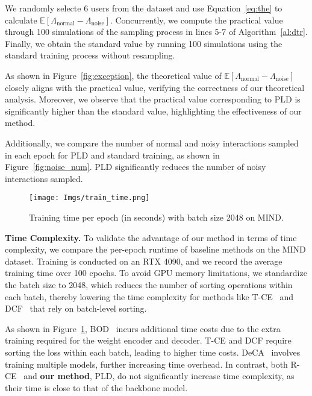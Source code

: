 We randomly selecte 6 users from the dataset and use Equation~\ref{eq:the} to calculate $\mathbb{E}[\Lambda_{\text{normal}} - \Lambda_{\text{noise}}]$. Concurrently, we compute the practical value through 100 simulations of the sampling process in lines 5-7 of Algorithm~\ref{al:dtr}. Finally, we obtain the standard value by running 100 simulations using the standard training process without resampling.

As shown in Figure~\ref{fig:exception}, the theoretical value of $\mathbb{E}[\Lambda_{\text{normal}} - \Lambda_{\text{noise}}]$ closely aligns with the practical value, verifying the correctness of our theoretical analysis. Moreover, we observe that the practical value corresponding to PLD is significantly higher than the standard value, highlighting the effectiveness of our method.

Additionally, we compare the number of normal and noisy interactions sampled in each epoch for PLD and standard training, as shown in Figure~\ref{fig:noise_num}. PLD significantly reduces the number of noisy interactions sampled. 

\begin{figure}
    \centering
    \texttt{[image: Imgs/train\_time.png]}
    \caption{Training time per epoch (in seconds) with batch size 2048 on MIND.}
    \label{fig:time}
\end{figure}

\textbf{Time Complexity.}
To validate the advantage of our method in terms of time complexity, we compare the per-epoch runtime of baseline methods on the MIND dataset. Training is conducted on an RTX 4090, and we record the average training time over 100 epochs. To avoid GPU memory limitations, we standardize the batch size to 2048, which reduces the number of sorting operations within each batch, thereby lowering the time complexity for methods like T-CE~\cite{wang2021denoising} and DCF~\cite{he2024double} that rely on batch-level sorting.

As shown in Figure~\ref{fig:time}, BOD~\cite{wang2023efficient} incurs additional time costs due to the extra training required for the weight encoder and decoder. T-CE and DCF require sorting the loss within each batch, leading to higher time costs. DeCA~\cite{wang2022learning} involves training multiple models, further increasing time overhead. In contrast, both R-CE~\cite{wang2021denoising} and \textbf{our method}, PLD, do not significantly increase time complexity, as their time is close to that of the backbone model.

